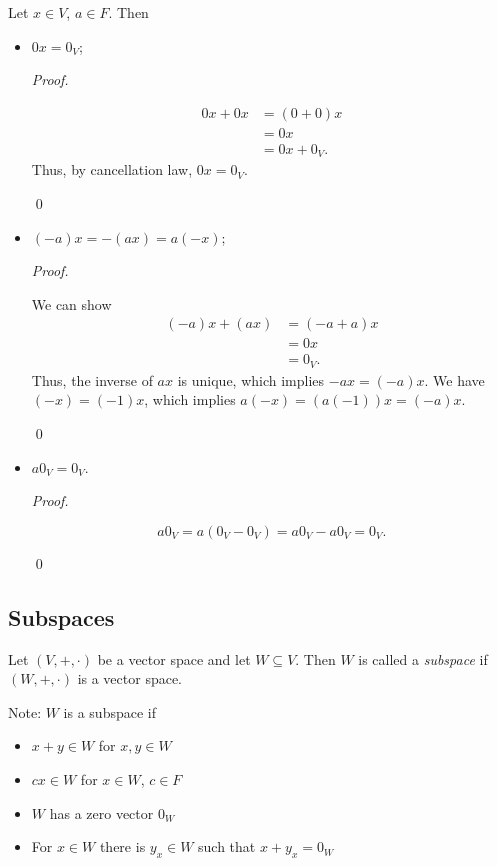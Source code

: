 \documentclass[12pt]{article}
\newenvironment{theorem}[2][Theorem]{\begin{trivlist}
\item[\hskip \labelsep {\bfseries #1}\hskip \labelsep {\bfseries #2.}]}{\end{trivlist}}
\newenvironment{definition}[2][Definition]{\begin{trivlist}
\item[\hskip \labelsep {\bfseries #1}\hskip \labelsep {\bfseries #2}]}{\end{trivlist}}
\newenvironment{sol}
    {\emph{Proof.}
    }
    {
    \qed
    }
\begin{document}
\begin{theorem}{1.2}
Let $x \in V$, $a \in F$. Then
\begin{itemize}
    \item $0x = 0_V$;
    
    \begin{sol}
    \begin{align*}
        0x + 0x &= (0 + 0)x \\
        &= 0x \\
        &= 0x + 0_V.
    \end{align*}
    Thus, by cancellation law, $0x = 0_V$.
    \end{sol}
    
    \item $(-a)x = -(ax) = a(-x)$;
    
    \begin{sol}
    We can show
    \begin{align*}
        (-a)x + (ax) &= (-a + a)x \\
        &= 0x \\
        &= 0_V.
    \end{align*}
    Thus, the inverse of $ax$ is unique, which implies $-ax = (-a)x$. We have $(-x) = (-1)x$, which implies $a(-x) = (a(-1))x = (-a)x$.
    \end{sol}
    
    \item $a0_V = 0_V$.
    
    \begin{sol}
    $$a0_V = a(0_V - 0_V) = a0_V - a0_V = 0_V.$$
    \end{sol}
\end{itemize}
\end{theorem}

\subsection{Subspaces}

\begin{definition}{2}
Let $(V, +, \cdot)$ be a vector space and let $W \subseteq V$. Then $W$ is called a \textit{subspace} if $(W, +, \cdot)$ is a vector space.
\end{definition}

\noindent Note: $W$ is a subspace if
\begin{itemize}
    \item $x + y \in W$ for $x,y \in W$
    \item $cx \in W$ for $x \in W$, $c \in F$
    \item $W$ has a zero vector $0_W$
    \item For $x \in W$ there is $y_x \in W$ such that $x + y_x = 0_W$
\end{itemize}
\end{document}
